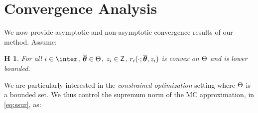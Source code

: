 \documentclass{article}
\newtheorem{assumption}{H\!\!}
\begin{document}
\vspace{-0.05in}
\section{Convergence Analysis}\label{sec:analysis}
\vspace{-0.05in}

We now provide asymptotic and non-asymptotic convergence results of our method. Assume:
\begin{assumption} \label{ass:lips}
For all $i \in \inter$, $\op \in \Param$, $z_i \in \Zset$, $\rsur{i}{\cdot}{\op}{z_i}$ is convex on $\Param$ and is lower bounded.
\end{assumption}
We are particularly interested in the \emph{constrained optimization} setting where $\Param$ is a bounded set.
We thus control the supremum norm of the MC approximation, in \eqref{eq:ssur}, as:
\end{document}
